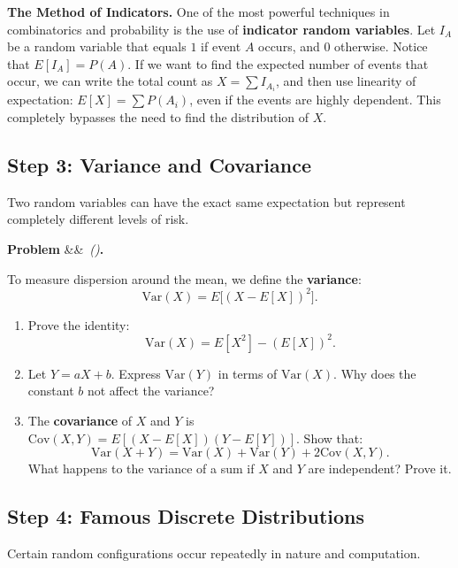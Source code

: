 \documentclass[12pt, a4paper]{article}
\newcounter{problem}
\newenvironment{problem}[1][]{%
  \refstepcounter{problem}%
  \par\vspace{6pt}%
  \noindent\textbf{\color{MidBlue}Problem \theproblem}%
  \ifx&#1&\else\ \textit{(#1)}\fi\textbf{.}\enskip
}{\par\vspace{4pt}}
\begin{document}
\begin{thought}
\textbf{The Method of Indicators.}
One of the most powerful techniques in combinatorics and probability is the use of \textbf{indicator random variables}. Let $I_A$ be a random variable that equals $1$ if event $A$ occurs, and $0$ otherwise. Notice that $E[I_A] = P(A)$. If we want to find the expected number of events that occur, we can write the total count as $X = \sum I_{A_i}$, and then use linearity of expectation: $E[X] = \sum P(A_i)$, even if the events are highly dependent. This completely bypasses the need to find the distribution of $X$.
\end{thought}

\subsection{Step 3: Variance and Covariance}

Two random variables can have the exact same expectation but represent completely different levels of risk.

\begin{problem}
\label{prob:variance}
To measure dispersion around the mean, we define the \textbf{variance}:
\[
  \text{Var}(X) = E\bigl[(X - E[X])^2\bigr].
\]
\begin{enumerate}[label=(\alph*), topsep=2pt]
  \item Prove the identity:
  \[
    \text{Var}(X) = E[X^2] - (E[X])^2.
  \]
  \item Let $Y = aX + b$. Express $\text{Var}(Y)$ in terms of $\text{Var}(X)$. Why does the constant $b$ not affect the variance?
  \item The \textbf{covariance} of $X$ and $Y$ is $\text{Cov}(X,Y) = E[(X - E[X])(Y - E[Y])]$. Show that:
  \[
    \text{Var}(X + Y) = \text{Var}(X) + \text{Var}(Y) + 2\text{Cov}(X,Y).
  \]
  What happens to the variance of a sum if $X$ and $Y$ are independent? Prove it.
\end{enumerate}
\end{problem}

\subsection{Step 4: Famous Discrete Distributions}

Certain random configurations occur repeatedly in nature and computation.
\end{document}
